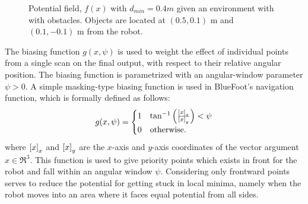 				\begin{figure}[t!]
					\centering
					\caption{Potential field, $f(x)$ with $d_{min}=0.4m$ given an environment with with obstacles. Objects are located at $(0.5,0.1)\text{ m}$ and $(0.1,-0.1)\text{ m}$ from the robot. }
					\label{fig::potential_field}
				\end{figure}

			The biasing function $g(x,\psi)$ is used to weight the effect of individual points from a single scan on the final output, with respect to their relative angular position. The biasing function is parametrized with an angular-window parameter $\psi>0$. A simple masking-type biasing function is used in BlueFoot's navigation function, which is formally defined as follows:
				\begin{equation}
					g(x,\psi) = 
					\begin{cases}
					1	& \tan^{-1}\left( \frac{\left[x\right]_{x}}{\left[x\right]_{y}} \right) < \psi \\
					0 	& \text{otherwise}.
					\end{cases}
				\end{equation}
			where $\left[x\right]_{x}$ and $\left[x\right]_{y}$ are the $x$-axis and $y$-axis coordinates of the vector argument $x\in\Re^{3}$. This function is used to give priority points which exists in front for the robot and fall within an angular window $\psi$. Considering only frontward points serves to reduce the potential for getting stuck in local minima, namely when the robot moves into an area where it faces equal potential from all sides. 

